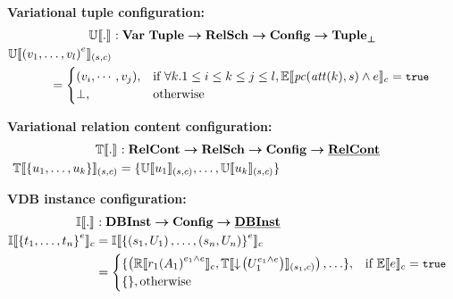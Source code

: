 \begin{figure}
\medskip
\textbf{Variational tuple configuration:}
%
\begin{alignat*}{1}%
\ouSemType [] . &: {\vartype \tupletype} \totype \vRelSchSet \totype \confSet \totype \maybe \tupletype\\
%
\ouSem{\vRelSch} {\annot  {\left( {\vi v \numAtts}\right)}}  &\\
& \hspace{-50pt} = \begin{cases}
(v_i, \cdots, v_j), &\If \forall k. 1 \leq i \leq k \leq j \leq l, \fSem {\getPCfrom {\getAtt {k}} \vRelSch \wedge \dimMeta} = \t\\
\bot, &\Otherwise
\end{cases}
\end{alignat*}

\textbf{Variational relation content configuration:}
%
\begin{alignat*}{1}%
\otSemType [] . &: \vRelContSet \totype \vRelSchSet \totype \confSet \totype \pRelContSet\\
%
\otSem {\vRelSch} {\setDef {\vi \tuple \numTuples}} &= \setDef {\ouSem {\vRelSch}{\tuple_1}, \hdots, \ouSem{\vRelSch} {\tuple_\numTuples}}
\end{alignat*}

\textbf{VDB instance configuration:}
%
\begin{alignat*}{1}%
\odbSem [] . &: \vdbInstSet \totype \confSet \totype \pInstSet\\
%
\odbSem { \annot  {\setDef {\vi \vTab \numRels}}} 
&=\odbSem { \annot  { \setDef {\left( \vRelSch_1, \vRelCont_1\right), \ldots, 
\left( \vRelSch_\numRels, \vRelCont_\numRels\right)}}}\\
& = \begin{cases}
\setDef{\left( \orSem {\vRel_1 \annot [\dimMeta_1 {\wedge \dimMeta}] {\left( \vAttList_1 \right)} }, 
\otSem {\vRelSch_1} {\pushIn {\annot [\dimMeta_1 {\wedge \dimMeta}] \vRelCont_1}} \right), \ldots}, &\If \fSem \dimMeta = \t \\
\setDef {}, \Otherwise
\end{cases}
\end{alignat*}


\end{figure}
